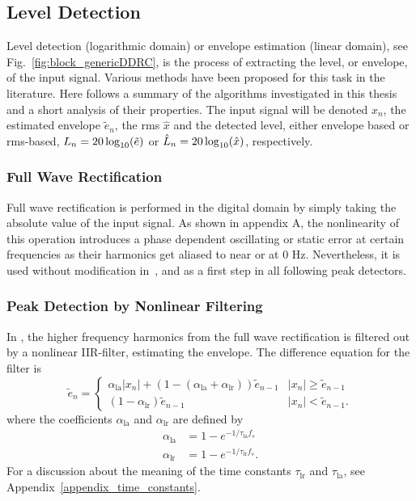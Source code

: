 \documentclass[../main2.tex]{subfiles}
\begin{document}
\subsection{Level Detection}\label{level_detection}
Level detection (logarithmic domain) or envelope estimation (linear domain), see Fig.~\ref{fig:block_genericDDRC}, is the process of extracting the level, or envelope, of the input signal. Various methods have been proposed for this task in the literature. Here follows a summary of the algorithms investigated in this thesis and a short analysis of their properties. The input signal will be denoted $x_n$, the estimated envelope $\tilde{e}_n$, the rms $\hat{x}$ and the detected level, either envelope based or rms-based, $L_n = 20\log_{10}(\tilde{e})$ or $\hat{L}_n=20\log_{10}(\hat{x})$, respectively. 

\subsubsection{Full Wave Rectification}\label{full_wave_rect}
Full wave rectification is performed in the digital domain by simply taking the absolute value of the input signal. As shown in appendix A, the nonlinearity of this operation introduces a phase dependent oscillating or static error at certain frequencies as their harmonics get aliased to near or at 0 Hz. Nevertheless, it is used without modification in~\cite{reiss2012tutorial}, and as a first step in all following peak detectors.

\subsubsection{Peak Detection by Nonlinear Filtering}\label{peak_detection}
In \cite{mcnally1984dynamic, zolzer1997digital}, the higher frequency harmonics from the full wave rectification is filtered out by a nonlinear IIR-filter, estimating the envelope. The difference equation for the filter is
\begin{equation}\label{eq:analog_det}
\tilde{e}_n = \begin{cases}
    \alpha_\text{la} |x_n| + (1- (\alpha_\text{la} + \alpha_\text{lr})) \tilde{e}_{n-1}  	& |x_n| \geq \tilde{e}_{n-1} \\
    (1-\alpha_\text{lr}) \tilde{e}_{n-1} 							& |x_n| < \tilde{e}_{n-1}.
\end{cases}
\end{equation}
where the coefficients $\alpha_\text{la}$ and $\alpha_\text{lr}$ are defined by
\begin{align}
\alpha_\text{la} &= 1 - e^{-1/\tau_\text{la} f_s } \label{eq:attack_coeff_def}\\
\alpha_\text{lr} &= 1 - e^{-1/\tau_\text{lr} f_s } \label{eq:release_coeff_def}.
\end{align}
For a discussion about the meaning of the time constants $\tau_\text{lr}$ and $\tau_\text{la}$, see Appendix~\ref{appendix_time_constants}.
\end{document}
